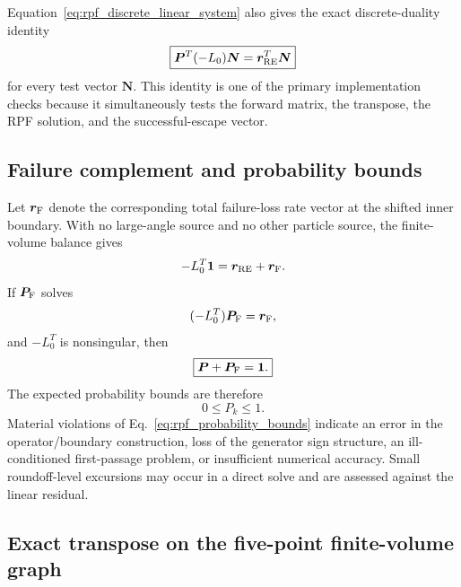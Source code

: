 \documentclass[11pt]{article}
\begin{document}
Equation~\eqref{eq:rpf_discrete_linear_system} also gives the exact discrete-duality
identity
\begin{equation}
 \boxed{
 \bm P^T(-L_0)\bm N
 =\bm r_{\rm RE}^T\bm N
 }
 \label{eq:rpf_discrete_duality}
\end{equation}
for every test vector $\bm N$.  This identity is one of the primary implementation
checks because it simultaneously tests the forward matrix, the transpose, the RPF
solution, and the successful-escape vector.

\subsection{Failure complement and probability bounds}
\label{sec:rpf_probability_partition}

Let $\bm r_{\rm F}$ denote the corresponding total failure-loss rate vector at the
shifted inner boundary.  With no large-angle source and no other particle source, the
finite-volume balance gives
\begin{equation}
 -L_0^T\bm 1=\bm r_{\rm RE}+\bm r_{\rm F}.
 \label{eq:rpf_total_escape_identity}
\end{equation}
If $\bm P_{\rm F}$ solves
\begin{equation}
 (-L_0^T)\bm P_{\rm F}=\bm r_{\rm F},
 \label{eq:rpf_failure_probability}
\end{equation}
and $-L_0^T$ is nonsingular, then
\begin{equation}
 \boxed{
 \bm P+\bm P_{\rm F}=\bm 1.
 }
 \label{eq:rpf_probability_partition}
\end{equation}
The expected probability bounds are therefore
\begin{equation}
 0\le P_k\le1.
 \label{eq:rpf_probability_bounds}
\end{equation}
Material violations of Eq.~\eqref{eq:rpf_probability_bounds} indicate an error in the
operator/boundary construction, loss of the generator sign structure, an ill-conditioned
first-passage problem, or insufficient numerical accuracy.  Small roundoff-level
excursions may occur in a direct solve and are assessed against the linear residual.

\subsection{Exact transpose on the five-point finite-volume graph}
\label{sec:rpf_exact_transpose}
\end{document}
